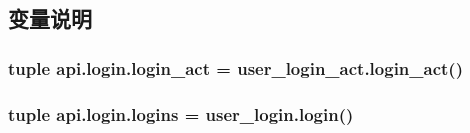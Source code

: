 \subsection{变量说明}
\hypertarget{namespaceapi_1_1login_a9c96b35f70f6582337b5eb19ec58eeab}{
\subsubsection[{login\-\_\-act}]{\setlength{\rightskip}{0pt plus 5cm}tuple api.\-login.\-login\-\_\-act = user\-\_\-login\-\_\-act.\-login\-\_\-act()}}\label{namespaceapi_1_1login_a9c96b35f70f6582337b5eb19ec58eeab}
\hypertarget{namespaceapi_1_1login_a285c09905a1027ad1c586bdd2184e860}{
\subsubsection[{logins}]{\setlength{\rightskip}{0pt plus 5cm}tuple api.\-login.\-logins = user\-\_\-login.\-login()}}\label{namespaceapi_1_1login_a285c09905a1027ad1c586bdd2184e860}
